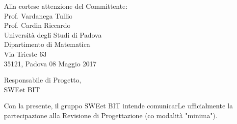 \begin{minipage}{0.7\textwidth}
	\begin{flushright}
		Alla cortese attenzione del Committente: \\
		Prof. Vardanega Tullio \\
		Prof. Cardin Riccardo \\
		Università degli Studi di Padova \\
		Dipartimento di Matematica \\
		Via Trieste 63\\
		35121, Padova
		\vspace{5mm} 08 Maggio 2017
	\end{flushright}
\end{minipage}

\begin{minipage}{\textwidth}
	\begin{flushleft}
		Responsabile di Progetto,\\
		SWEet BIT\\
	\end{flushleft}
\end{minipage}

\vspace{5mm}Con la presente, il gruppo SWEet BIT intende comunicarLe ufficialmente la partecipazione
alla Revisione di Progettazione (co modalità "minima").

